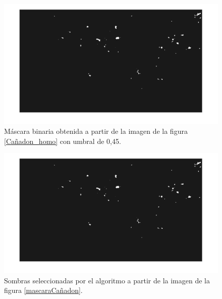 \begin{figure}[h!]
    \includegraphics[width=\textwidth]{Imagenes/Homomorfico/DJI_340_bin.png}
     \hfill
     \caption{Máscara binaria obtenida a partir de la imagen de la figura \ref{Cañadon_homo} con umbral de 0,45.}
    \label{mascaraCañadon2}
\end{figure}

\begin{figure}[h!]
    \includegraphics[width=\textwidth]{Imagenes/Homomorfico/DJI_340_bin.png}
     \hfill
     \caption{Sombras seleccionadas por el algoritmo a partir de la imagen de la figura \ref{mascaraCañadon}.}
    \label{seleccionadaCañadon2}
\end{figure}